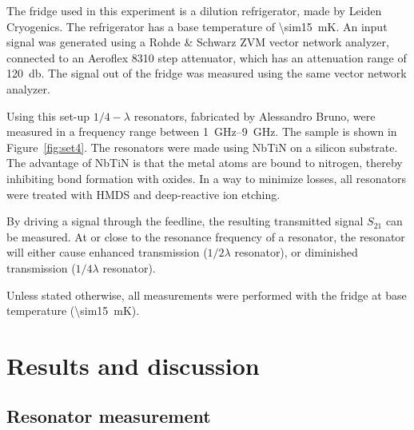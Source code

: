 \documentclass[12pt]{report}
\begin{document}
The fridge used in this experiment is a dilution refrigerator, made by Leiden Cryogenics. The refrigerator has a base temperature of \SI{\sim15}{\milli \kelvin}. An input signal was generated using a Rohde \& Schwarz ZVM vector network analyzer, connected to an Aeroflex 8310 step attenuator, which has an attenuation range of \SI{120}{\decibel}. The signal out of the fridge was measured using the same vector network analyzer.

Using this set-up $1/4 - \lambda$ resonators, fabricated by Alessandro Bruno, were measured in a frequency range between \SIrange{1}{9}{\giga \hertz}. The sample is shown in Figure~\ref{fig:set4}. The resonators were made using NbTiN on a silicon substrate. The advantage of NbTiN is that the metal atoms are bound to nitrogen, thereby inhibiting bond formation with oxides. In a way to minimize losses, all resonators were treated with HMDS and deep-reactive ion etching.

By driving a signal through the feedline, the resulting transmitted signal $S_{21}$ can be measured. At or close to the resonance frequency of a resonator, the resonator will either cause enhanced transmission ($1/2 \lambda$ resonator), or diminished transmission ($1/4 \lambda$ resonator).

Unless stated otherwise, all measurements were performed with the fridge at base temperature (\SI{\sim15}{\milli \kelvin}).

\section{Results and discussion}


\subsection{Resonator measurement}
\end{document}
